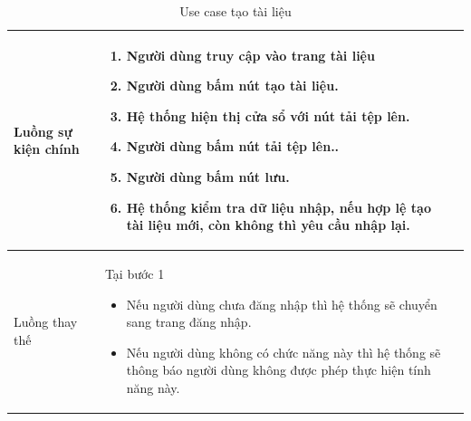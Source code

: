 \documentclass[12pt,a4paper]{article}
\begin{document}
\begin{table}[H]
\begin{tabular}{|p{3.5cm}|p{11.5cm}|c|}
            Luồng sự kiện chính & \vspace{-.8cm}\begin{enumerate}
                                                    \item Người dùng truy cập vào trang tài liệu
                                                    \item  Người dùng bấm nút tạo tài liệu.
                                                    \item  Hệ thống hiện thị cửa sổ với nút tải tệp lên.
                                                    \item  Người dùng bấm nút tải tệp lên..
                                                    \item Người dùng bấm nút lưu.
                                                    \item Hệ thống kiểm tra dữ liệu nhập, nếu hợp lệ tạo tài liệu mới, còn không thì yêu cầu nhập lại.
            \end{enumerate}
            \\
            \hline
            Luồng thay thế & Tại bước 1\newline
            \vspace{-.8cm}\begin{itemize}
                              \item Nếu người dùng chưa đăng nhập thì hệ thống sẽ chuyển sang trang đăng nhập.
                              \item  Nếu người dùng không có chức năng này thì hệ thống sẽ thông báo người dùng không được phép thực hiện tính năng này.
            \end{itemize}
            \\
            \hline
        \end{tabular}
        \caption{Use case tạo tài liệu}
    \end{table}


\end{document}
